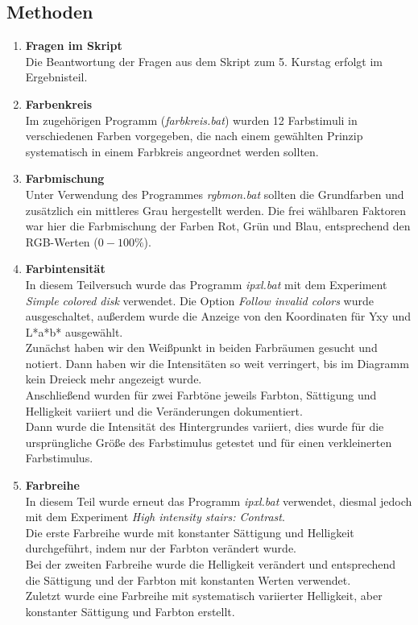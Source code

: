 \documentclass[11pt]{article}
\newcommand{\RM}[1]{\MakeUppercase{\romannumeral #1{}}}
\begin{document}
\subsection{Methoden}
\begin{enumerate}
\item \textbf{Fragen im Skript} \\
Die Beantwortung der Fragen aus dem Skript zum 5. Kurstag erfolgt im Ergebnisteil.
\item \textbf{Farbenkreis} \\
Im zugehörigen Programm (\textit{farbkreis.bat}) wurden 12 Farbstimuli in verschiedenen Farben vorgegeben, die nach einem gewählten Prinzip systematisch in einem Farbkreis angeordnet werden sollten. 
\item \textbf{Farbmischung \RM{1}} \\
Unter Verwendung des Programmes \textit{rgbmon.bat} sollten die Grundfarben und zusätzlich ein mittleres Grau hergestellt werden. Die frei wählbaren Faktoren war hier die Farbmischung der Farben Rot, Grün und Blau, entsprechend den RGB-Werten ($0-100\%$). 
\item \textbf{Farbintensität} \\
In diesem Teilversuch wurde das Programm \textit{ipxl.bat} mit dem Experiment \textit{Simple colored disk} verwendet. Die Option \textit{Follow invalid colors} wurde ausgeschaltet, außerdem wurde die Anzeige von den Koordinaten für Yxy und L*a*b* ausgewählt. \\
Zunächst haben wir den Weißpunkt in beiden Farbräumen gesucht und notiert. Dann haben wir die Intensitäten so weit verringert, bis im Diagramm kein Dreieck mehr angezeigt wurde. \\
Anschließend wurden für zwei Farbtöne jeweils Farbton, Sättigung und Helligkeit variiert und die Veränderungen dokumentiert. \\
Dann wurde die Intensität des Hintergrundes variiert, dies wurde für die ursprüngliche Größe des Farbstimulus getestet und für einen verkleinerten Farbstimulus.
\item \textbf{Farbreihe} \\
In diesem Teil wurde erneut das Programm \textit{ipxl.bat} verwendet, diesmal jedoch mit dem Experiment \textit{High intensity stairs: Contrast}. \\
Die erste Farbreihe wurde mit konstanter Sättigung und Helligkeit durchgeführt, indem nur der Farbton verändert wurde. \\
Bei der zweiten Farbreihe wurde die Helligkeit verändert und entsprechend die Sättigung und der Farbton mit konstanten Werten verwendet. \\
Zuletzt wurde eine Farbreihe mit systematisch variierter Helligkeit, aber konstanter Sättigung und Farbton erstellt.


\end{enumerate}
\end{document}
